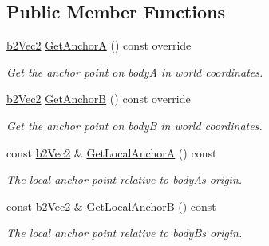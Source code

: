 \subsection*{Public Member Functions}
\begin{DoxyCompactItemize}
\item 
\mbox{\label{classb2RevoluteJoint_a9878591c460a4e1575f8a77c237608ae}} 
\mbox{\hyperlink{structb2Vec2}{b2\+Vec2}} \mbox{\hyperlink{classb2RevoluteJoint_a9878591c460a4e1575f8a77c237608ae}{Get\+AnchorA}} () const override
\begin{DoxyCompactList}\small\item\em Get the anchor point on bodyA in world coordinates. \end{DoxyCompactList}\item 
\mbox{\label{classb2RevoluteJoint_aa30a5d414b2ff699cc17567ff6e53e6b}} 
\mbox{\hyperlink{structb2Vec2}{b2\+Vec2}} \mbox{\hyperlink{classb2RevoluteJoint_aa30a5d414b2ff699cc17567ff6e53e6b}{Get\+AnchorB}} () const override
\begin{DoxyCompactList}\small\item\em Get the anchor point on bodyB in world coordinates. \end{DoxyCompactList}\item 
\mbox{\label{classb2RevoluteJoint_af8cefd09d50a4e349613722809b8c823}} 
const \mbox{\hyperlink{structb2Vec2}{b2\+Vec2}} \& \mbox{\hyperlink{classb2RevoluteJoint_af8cefd09d50a4e349613722809b8c823}{Get\+Local\+AnchorA}} () const
\begin{DoxyCompactList}\small\item\em The local anchor point relative to bodyA\textquotesingle{}s origin. \end{DoxyCompactList}\item 
\mbox{\label{classb2RevoluteJoint_ac58e115df370181adc1ea1c486d84dc6}} 
const \mbox{\hyperlink{structb2Vec2}{b2\+Vec2}} \& \mbox{\hyperlink{classb2RevoluteJoint_ac58e115df370181adc1ea1c486d84dc6}{Get\+Local\+AnchorB}} () const
\begin{DoxyCompactList}\small\item\em The local anchor point relative to bodyB\textquotesingle{}s origin. \end{DoxyCompactList}\item 

\end{DoxyCompactItemize}
